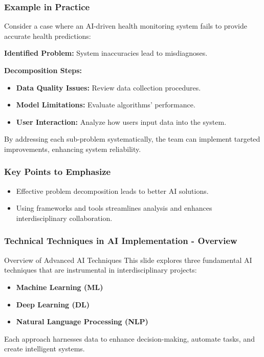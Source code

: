 \documentclass[aspectratio=169]{beamer}
\begin{document}
\begin{frame}[fragile]
    \frametitle{Example in Practice}
    
    Consider a case where an AI-driven health monitoring system fails to provide accurate health predictions:
    
    \textbf{Identified Problem:} System inaccuracies lead to misdiagnoses.
    
    \textbf{Decomposition Steps:}
    \begin{itemize}
        \item \textbf{Data Quality Issues:} Review data collection procedures.
        \item \textbf{Model Limitations:} Evaluate algorithms' performance.
        \item \textbf{User Interaction:} Analyze how users input data into the system.
    \end{itemize}
    
    By addressing each sub-problem systematically, the team can implement targeted improvements, enhancing system reliability.
\end{frame}

\begin{frame}[fragile]
    \frametitle{Key Points to Emphasize}
    
    \begin{itemize}
        \item Effective problem decomposition leads to better AI solutions.
        \item Using frameworks and tools streamlines analysis and enhances interdisciplinary collaboration.
    \end{itemize}
\end{frame}

\begin{frame}[fragile]
    \frametitle{Technical Techniques in AI Implementation - Overview}
    \begin{block}{Overview of Advanced AI Techniques}
        This slide explores three fundamental AI techniques that are instrumental in interdisciplinary projects:
        \begin{itemize}
            \item \textbf{Machine Learning (ML)}
            \item \textbf{Deep Learning (DL)}
            \item \textbf{Natural Language Processing (NLP)}
        \end{itemize}
        Each approach harnesses data to enhance decision-making, automate tasks, and create intelligent systems.
    \end{block}
\end{frame}
\end{document}
